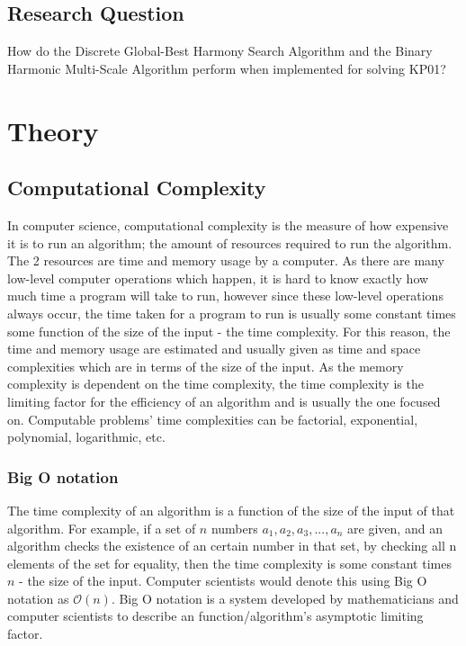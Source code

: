 \documentclass[titlepage]{article}
\begin{document}
\subsection{Research Question}
How do the Discrete Global-Best Harmony Search Algorithm and the Binary Harmonic Multi-Scale Algorithm perform when implemented for solving KP01?

\newpage

\section{Theory}
\subsection{Computational Complexity}
In computer science, computational complexity is the measure of how expensive it is to run an algorithm; the amount of resources required to run the algorithm. The 2 resources are time and memory usage by a computer. As there are many low-level computer operations which happen, it is hard to know exactly how much time a program will take to run, however since these low-level operations always occur, the time taken for a program to run is usually some constant times some function of the size of the input - the time complexity. For this reason, the time and memory usage are estimated and usually given as time and space complexities which are in terms of the size of the input.  As the memory complexity is dependent on the time complexity, the time complexity is the limiting factor for the efficiency of an algorithm and is usually the one focused on. Computable problems' time complexities can be factorial, exponential, polynomial, logarithmic, etc.

\subsubsection*{Big O notation}
The time complexity of an algorithm is a function of the size of the input of that algorithm. For example, if a set of $n$ numbers $a_1, a_2, a_3, ..., a_n$ are given, and an algorithm checks the existence of an certain number in that set, by checking all n elements of the set for equality, then the time complexity is some constant times $n$ - the size of the input. Computer scientists would denote this using Big O notation as $\mathcal{O}(n)$. Big O notation is a system developed by mathematicians and computer scientists to describe an function/algorithm's asymptotic limiting factor. \cite{bigO}
\end{document}
